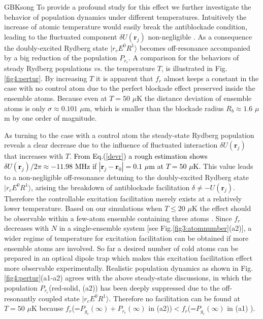 \documentclass{cpbtex}
\begin{document}
\begin{CJK*}{GBK}{song}
To provide a profound study for this effect we further investigate the behavior of population dynamics under different temperatures. Intuitively the increase of atomic temperature would easily break the antiblockade condition, leading to the fluctuated component $\delta U(\bm{r}_j)$ non-negligible \cite{Ostmann_2019}. As a consequence the doubly-excited Rydberg state $|r_cE^0R^1\rangle$ becomes off-resonance accompanied by a big reduction of the population $P_{r_c}$. 
A comparison for the behaviors of steady Rydberg populations {\it vs.} the temperature $T$, is illustrated in Fig.\ref{fig4:pertur}. 
By increasing $T$ it is apparent that $f_r$ almost keeps a constant in the case with no control atom due to the perfect blockade effect preserved inside the ensemble atoms. Because even at $T=50$ $\mu$K the distance deviation of ensemble atoms is only $\sigma \approx 0.101 $ $\mu$m, which is smaller than the blockade radius $R_b\approx 1.6$ $\mu$m by one order of magnitude.



As turning to the case with a control atom the steady-state Rydberg population reveals a clear decrease due to the influence of fluctuated interaction $\delta U(\bm{r}_j)$ that increases with $T$. \textcolor{black}{From Eq.(\ref{devr}) a rough estimation shows $\delta U(\bm{r}_j)/2\pi\approx -11.98$ MHz if $|\bm{r}_j-\bm{r}_0|=0.1$ $\mu$m at $T=50$ $\mu$K.} This value leads to a non-negligible off-resonance detuning to the doubly-excited Rydberg state $|r_cE^0R^1\rangle$, arising the breakdown of antiblockade facilitation $\delta\neq-U(\bm{r}_j)$. Therefore the controllable excitation facilitation merely exists at a relatively lower temperature. Based on our simulations when $T\leq20$ $\mu$K the effect should be observable within a few-atom ensemble containing three atoms \cite{PhysRevA.85.062708}. Since $f_r$ decreases with $N$ in a single-ensemble system [see Fig.\ref{fig3:atomnumber}(a2)], 
a wider regime of temperature for excitation facilitation can be obtained if more ensemble atoms are involved. So far a desired number of cold atoms can be prepared in an optical dipole trap \cite{PhysRevLett.85.3777} which makes this excitation facilitation effect more observable experimentally.
Realistic population dynamics as shown in Fig.\ref{fig4:pertur}(a1-a2) agrees with the above steady-state discussions, in which the population $P_{r_c}$(red-solid, (a2)) has been deeply suppressed due to the off-resonantly coupled state $|r_cE^0R^1\rangle$. Therefore no facilitation can be found at $T=50$ $\mu$K because $f_r$(=$P_{g_c}(\infty)+P_{r_c}(\infty)$ in (a2))$<f_r$(=$P_{g_c}(\infty)$ in (a1) ).



\end{CJK*}
\end{document}
